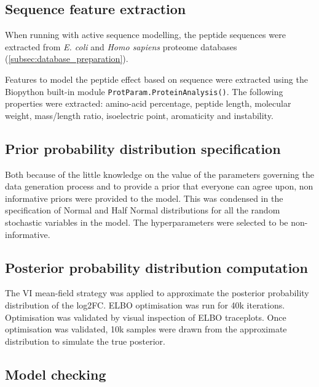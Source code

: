 \subsection{Sequence feature extraction}

When running with active sequence modelling, the peptide sequences were extracted from \textit{E. coli} and \textit{Homo sapiens} proteome databases (\ref{subsec:database_preparation}).

Features to model the peptide effect based on sequence were extracted using the Biopython \cite{Cock2009} built-in  module \texttt{ProtParam.ProteinAnalysis()}. The following properties were extracted: amino-acid percentage, peptide length, molecular weight, mass/length ratio, isoelectric point, aromaticity and instability.


\subsection{Prior probability distribution specification}

Both because of the little knowledge on the value of the parameters governing the data generation process and to provide a prior that everyone can agree upon, non informative priors were provided to the model. This was condensed in the specification of Normal and Half Normal distributions for all the random stochastic variables in the model. The hyperparameters were selected to be non-informative.

\subsection{Posterior probability distribution computation}
\label{subsec:posterior_compute}

The \ac{VI} mean-field strategy was applied to approximate the posterior probability distribution of the \ac{log2FC}. \ac{ELBO} optimisation was run for 40k iterations. Optimisation was validated by visual inspection of \ac{ELBO} traceplots. Once optimisation was validated, 10k samples were drawn from the approximate distribution to simulate the true posterior.

\subsection{Model checking}

